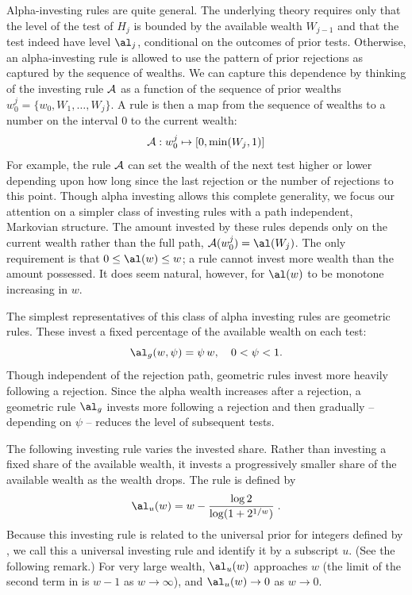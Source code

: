 \documentclass[12pt]{article}
\begin{document}
 
 Alpha-investing rules are quite general.  The underlying theory requires only
 that the level of the test of $H_j$ is bounded by the available wealth
 $W_{j-1}$ and that the test indeed have level $\al_j$, conditional on the
 outcomes of prior tests.  Otherwise, an alpha-investing rule is allowed to use
 the pattern of prior rejections as captured by the sequence of wealths.  We can
 capture this dependence by thinking of the investing rule ${\cal A}$ as a
 function of the sequence of prior wealths $w_0^j = \{w_0, W_1, \ldots, W_j\}$.
  A rule is then a map from the sequence of wealths to a number on the interval
 0 to the current wealth:
 \begin{equation}
    {\cal A}: w_0^j \mapsto [0, \min(W_j,1)]    
 \label{eq:A}
 \end{equation}
 For example, the rule $\cal A$ can set the wealth of the next test higher or
 lower depending upon how long since the last rejection or the number of
 rejections to this point.  Though alpha investing allows this complete
 generality, we focus our attention on a simpler class of investing rules with a
 path independent, Markovian structure.  The amount invested by these rules
 depends only on the current wealth rather than the full path, ${\cal A}(w_0^j)
 = \al(W_j)$.  The only requirement is that $0 \le \al(w) \le w$; a rule cannot
 invest more wealth than the amount possessed.  It does seem natural, however,
 for $\al(w)$ to be monotone increasing in $w$.


 The simplest representatives of this class of alpha investing rules are
 geometric rules.  These invest a fixed percentage of the available wealth on
 each test:
 \begin{equation}
    \al_g(w, \psi) = \psi \, w, \quad  0 < \psi < 1.
 \label{eq:Ageo}
 \end{equation}
 Though independent of the rejection path, geometric rules invest more heavily
 following a rejection.  Since the alpha wealth increases after a rejection, a
 geometric rule $\al_g$ invests more following a rejection and then gradually --
 depending on $\psi$ -- reduces the level of subsequent tests.


 The following investing rule varies the invested share.  Rather than investing
 a fixed share of the available wealth, it invests a progressively smaller share
 of the available wealth as the wealth drops.  The rule is defined by
 \begin{equation}
   \al_u(w) = w - \frac{\log 2}{\log(1+2^{1/w})} \;.   
 \label{eq:Auniv}
 \end{equation}
 Because this investing rule is related to the universal prior for integers
 defined by \citet{rissanen83}, we call this a universal investing rule and
 identify it by a subscript $u$.  (See the following remark.)  For very large
 wealth, $\al_u(w)$ approaches $w$ (the limit of the second term in
  is $w-1$ as $w \rightarrow \infty$), and $\al_u(w)
 \rightarrow 0$ as $w \rightarrow 0$.
\end{document}

